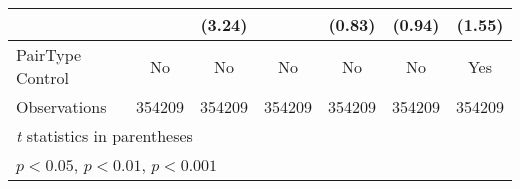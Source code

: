 {\begin{tabular}{l*{6}{c}}
                &                  &   (3.24)         &                  &   (0.83)         &   (0.94)         &   (1.55)         \\
\hline
PairType Control&       No         &       No         &       No         &       No         &       No         &      Yes         \\
Observations    &   354209         &   354209         &   354209         &   354209         &   354209         &   354209         \\
\hline\hline
\multicolumn{7}{l}{\footnotesize \textit{t} statistics in parentheses}\\
\multicolumn{7}{l}{\footnotesize \sym{*} \(p<0.05\), \sym{**} \(p<0.01\), \sym{***} \(p<0.001\)}\\
\end{tabular}
}
